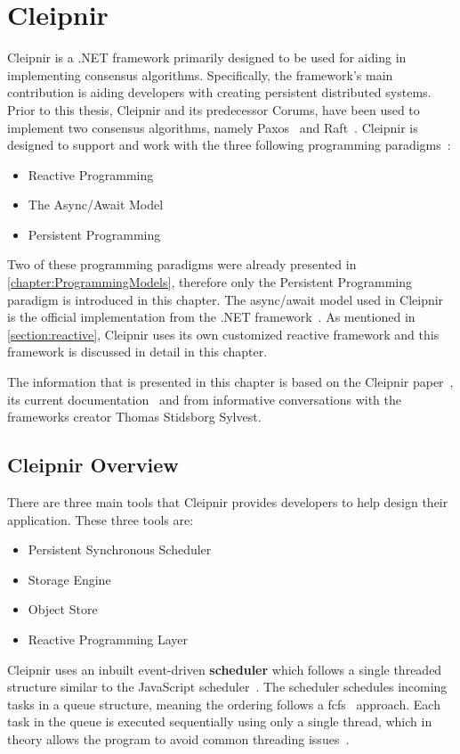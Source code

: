 \chapter{Cleipnir}
\label{chapter:Cleipnir}
\iffalse
Cleipnir is a .NET framework primarily designed to be used for aiding in implementing consensus algorithms. Specifically, the framework's main contribution is aiding developers with creating persistent distributed systems. Prior to this thesis, Cleipnir and its predecessor Corums, have been used to implement two consensus algorithms, namely Paxos~\cite[p.~32-38]{PAPER:EivindPaper} and Raft~\cite[p.~13-15]{PAPER:PaxosCleipnir}.
Cleipnir is designed to support and work with the three following programming paradigms~\cite[p.~5]{PAPER:PaxosCleipnir}:
\begin{itemize}
\item {Reactive Programming}
\item {The Async/Await Model}
\item {Persistent Programming}
\end{itemize}

Two of these programming paradigms were already presented in \autoref{chapter:ProgrammingModels}, therefore only the Persistent Programming paradigm is introduced in this chapter. The async/await model used in Cleipnir is the official implementation from the .NET framework~\cite{DOC:AsyncAwait}. As mentioned in \autoref{section:reactive}, Cleipnir uses its own customized reactive framework and this framework is discussed in detail in this chapter.

The information that is presented in this chapter is based on the Cleipnir paper~\cite{PAPER:PaxosCleipnir}, its current documentation~\cite{DOC:Cleipnir} and from informative conversations with the frameworks creator Thomas Stidsborg Sylvest.

\section{Cleipnir Overview}
\label{section:CleipnirOv}
There are three main tools that Cleipnir provides developers to help design their application.
These three tools are:
\begin{itemize}
	\item{Persistent Synchronous Scheduler}
	\item{Storage Engine}
	\item{Object Store}
	\item{Reactive Programming Layer}
\end{itemize}
Cleipnir uses an inbuilt event-driven \textbf{scheduler} which follows a single threaded structure similar to the JavaScript scheduler~\cites[p.~7]{PAPER:PaxosCleipnir}{WEB:CleipnirScheduler}. The scheduler schedules incoming tasks in a queue structure, meaning the ordering follows a \ac{fcfs}~\cite{WEB:FIFO} approach. Each task in the queue is executed sequentially using only a single thread, which in theory allows the program to avoid common threading issues~\cite[p.~7]{PAPER:PaxosCleipnir}. %

